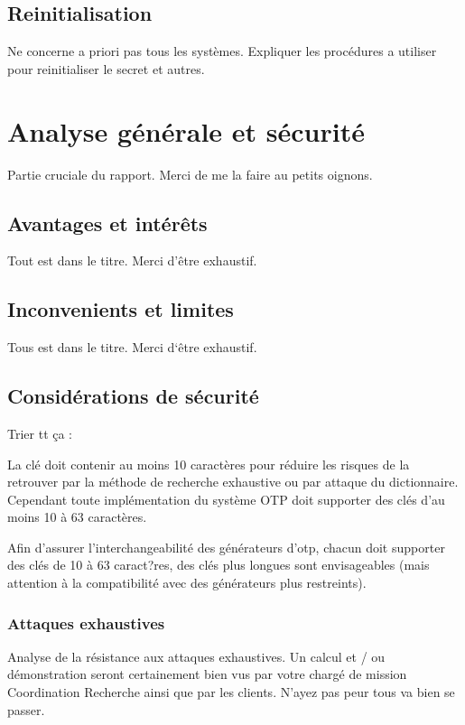 \documentclass{../res/univ-projet}
\begin{document}
  \subsection{Reinitialisation}
    Ne concerne a priori pas tous les systèmes. Expliquer les procédures a utiliser pour reinitialiser le secret et autres.

\section{Analyse générale et sécurité}
  Partie cruciale du rapport. Merci de me la faire au petits oignons.

  \subsection{Avantages et intér\^ets}
    Tout est dans le titre. Merci d'\^etre exhaustif.
  
  \subsection{Inconvenients et limites}
    Tous est dans le titre. Merci d`\^etre exhaustif.
  
  \subsection{Considérations de sécurité}
    Trier tt ça :

    La clé doit contenir au moins 10 caractères pour réduire les risques de la retrouver par la méthode de recherche exhaustive ou par attaque du dictionnaire. Cependant toute implémentation du système OTP doit supporter des clés d'au moins 10 à 63 caractères.

    Afin d'assurer l'interchangeabilité des générateurs d'otp, chacun doit supporter des clés de 10 à 63 caract?res, des clés plus longues sont envisageables (mais attention à la compatibilité avec des générateurs plus restreints).

    \subsubsection{Attaques exhaustives}
      Analyse de la résistance aux attaques exhaustives. Un calcul et / ou démonstration seront certainement bien vus par votre chargé de mission 
      \og{}Coordination Recherche\fg{} ainsi que par les clients. N'ayez pas peur tous va bien se passer.
    
\end{document}
